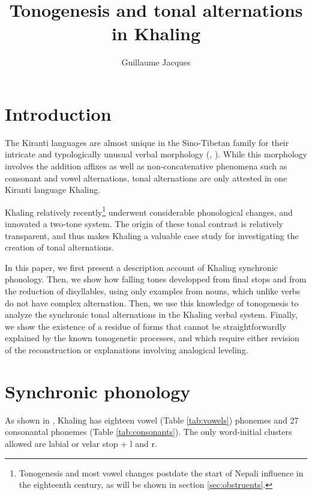 \documentclass[oldfontcommands,oneside,a4paper,11pt]{article}
\newcommand{\ipa}[1]{{\phon \mbox{#1}}} %
\begin{document}
 

\title{ Tonogenesis and tonal alternations in Khaling }
\author{Guillaume Jacques }
\maketitle
\linenumbers
 
 \section{Introduction}
The Kiranti languages are almost unique in the Sino-Tibetan family for their intricate and typologically unusual verbal morphology (\citealt{bickel07chintang}, \citealt{jacques12agreement}). While this morphology involves the addition affixes as well as non-concatenative phenomena such as consonant and vowel alternations, tonal alternations are only attested in one Kiranti language Khaling.

Khaling relatively recently\footnote{Tonogenesis and most vowel changes postdate the start of Nepali influence in the eighteenth century, as will be shown in section \ref{sec:obstruents}.} underwent considerable phonological changes, and innovated a two-tone system. The origin of these tonal contrast is relatively transparent, and thus makes Khaling a valuable case study for investigating the creation of tonal alternations. 

In this paper, we first present a description account of Khaling synchronic phonology. Then, we show how falling tones developped from final stops and from the reduction of disyllables, using only examples from nouns, which unlike verbs do not have complex alternation. Then, we use this knowledge of tonogenesis to analyze the synchronic tonal alternations in the Khaling verbal system. Finally, we show the existence of a residue of forms that cannot be straightforwardly explained by the known tonogenetic processes, and which require either revision of the reconstruction or explanations involving analogical leveling.

\section{Synchronic phonology} \label{sec:synchr}
As shown in \citet[1098]{jacques12khaling}, Khaling has eighteen vowel (Table \ref{tab:vowels}) phonemes and 27 consonantal phonemes (Table \ref{tab:consonants}). The only word-initial clusters allowed are labial or velar stop + \ipa{l} and \ipa{r}. 
\end{document}
